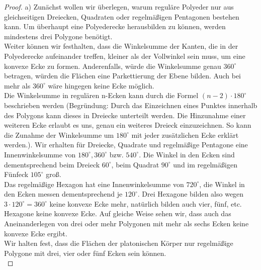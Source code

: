 \begin{proof}
a) Zunächst wollen wir überlegen, warum reguläre Polyeder nur aus gleichseitigen Dreiecken, Quadraten oder regelmäßigen Pentagonen bestehen kann. Um überhaupt eine Polyederecke herausbilden zu können, werden mindestens drei Polygone benötigt. \\
Weiter können wir festhalten, dass die Winkelsumme der Kanten, die in der Polyederecke aufeinander treffen, kleiner als der Vollwinkel sein muss, um eine konvexe Ecke zu formen. Anderenfalls, würde die Winkelsumme genau $360^\circ$ betragen, würden die Flächen eine Parkettierung der Ebene bilden. Auch bei mehr als $360^\circ$ wäre hingegen keine Ecke möglich.\\
Die Winkelsumme in regulären n-Ecken kann durch die Formel $(n-2)\cdot 180^\circ$ beschrieben werden (Begründung: Durch das Einzeichnen eines Punktes innerhalb des Polygons kann dieses in Dreiecke unterteilt werden. Die Hinzunahme einer weiteren Ecke erlaubt es uns, genau ein weiteres Dreieck einzuzeichnen. So kann die Zunahme der Winkelsumme um $180^\circ$ mit jeder zusätzlichen Ecke erklärt werden.). Wir erhalten für Dreiecke, Quadrate und regelmäßige Pentagone eine Innenwinkelsumme von $180^\circ, 360^\circ$ bzw. $540^\circ$. Die Winkel in den Ecken sind dementsprechend beim Dreieck $60^\circ$, beim Quadrat $90^\circ$ und im regelmäßigen Fünfeck $105^\circ$ groß. \\
Das regelmäßige Hexagon hat eine Innenwinkelsumme von $720^\circ$, die Winkel in den Ecken messen dementsprechend je $120^\circ$. Drei Hexagone bilden also wegen $3\cdot 120^\circ=360^\circ$ keine konvexe Ecke mehr, natürlich bilden auch vier, fünf, etc. Hexagone keine konvexe Ecke. Auf gleiche Weise sehen wir, dass auch das Aneinanderlegen von drei oder mehr Polygonen mit mehr als sechs Ecken keine konvexe Ecke ergibt.\\
Wir halten fest, dass die Flächen der platonischen Körper nur regelmäßige Polygone mit drei, vier oder fünf Ecken sein können.\\


\end{proof}

